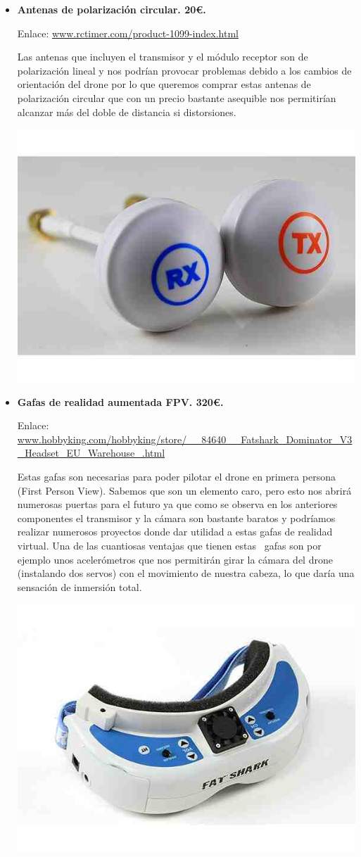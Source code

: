 \documentclass[12pt,twoside]{report}
\begin{document}
\begin{itemize}
\item {\bf Antenas de polarización circular. 20\euro{}.}

Enlace: \url{www.rctimer.com/product-1099-index.html}

Las antenas que incluyen el transmisor y el módulo receptor son de polarización lineal y nos podrían provocar problemas debido a los cambios de orientación del drone por lo que queremos comprar estas antenas de polarización circular que con un precio bastante asequible nos permitirían alcanzar más del doble de distancia si distorsiones.


\centerline{
    \includegraphics[width=0.45\linewidth]{fotos/antena.jpg}}

\item {\bf Gafas de realidad aumentada FPV. 320\euro{}.}

Enlace: \url{www.hobbyking.com/hobbyking/store/__84640__Fatshark_Dominator_V3_Headset_EU_Warehouse_.html}

Estas gafas son necesarias para poder pilotar el drone en primera persona (First Person View). Sabemos que son un elemento caro, pero esto nos abrirá numerosas puertas para el futuro ya que como se observa en los anteriores componentes el transmisor y la cámara son bastante baratos y podríamos realizar numerosos proyectos donde dar utilidad a estas gafas de realidad virtual. Una de las cuantiosas ventajas que tienen estas  gafas son por ejemplo unos acelerómetros que nos permitirán girar la cámara del drone (instalando dos servos) con el movimiento de nuestra cabeza, lo que daría una sensación de inmersión total.

\centerline{
    \includegraphics[width=0.45\linewidth]{fotos/gafas.jpg}}

\end{itemize}
\end{document}
